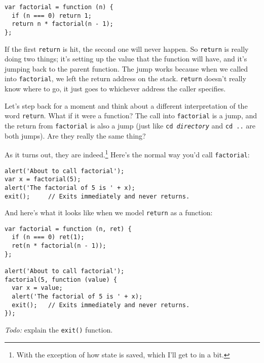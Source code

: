 \documentclass{article}
\begin{document}
\begin{verbatim}
var factorial = function (n) {
  if (n === 0) return 1;
  return n * factorial(n - 1);
};
\end{verbatim}

  \noindent If the first {\tt return} is hit, the second one will never happen. So {\tt return} is really doing two things; it's setting up the value that the function will have, and it's
  jumping back to the parent function. The jump works because when we called into {\tt factorial}, we left the return address on the stack. {\tt return} doesn't really know where to go, it
  just goes to whichever address the caller specifies.

  Let's step back for a moment and think about a different interpretation of the word {\tt return}. What if it were a function? The call into {\tt factorial} is a jump, and the return from
  {\tt factorial} is also a jump (just like {\tt cd {\em directory}} and {\tt cd ..} are both jumps). Are they really the same thing?

  As it turns out, they are indeed.\footnote{With the exception of how state is saved, which I'll get to in a bit.} Here's the normal way you'd call {\tt factorial}:

\begin{verbatim}
alert('About to call factorial');
var x = factorial(5);
alert('The factorial of 5 is ' + x);
exit();     // Exits immediately and never returns.
\end{verbatim}

  \noindent And here's what it looks like when we model {\tt return} as a function:

\begin{verbatim}
var factorial = function (n, ret) {
  if (n === 0) ret(1);
  ret(n * factorial(n - 1));
};

alert('About to call factorial');
factorial(5, function (value) {
  var x = value;
  alert('The factorial of 5 is ' + x);
  exit();   // Exits immediately and never returns.
});
\end{verbatim}

  {\em Todo:} explain the {\tt exit()} function.
\end{document}
